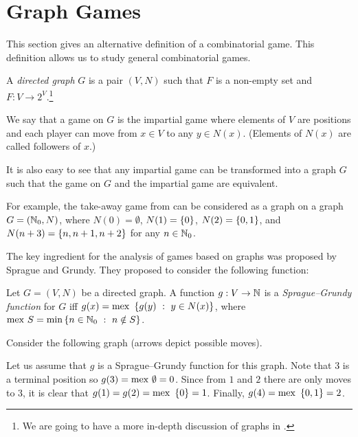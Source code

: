 \chapter{Graph Games}
This section gives an alternative definition of a combinatorial game.
This definition allows us to study general combinatorial games.
\begin{definition}
  A \emph{directed graph} $G$ is a pair $(V, N)$ such that $F$ is a non-empty
  set and $F : V \to 2^V$.\footnote{%
    We are going to have a more in-depth
    discussion of graphs in .
  }

  We say that a game on $G$ is the impartial game where elements of $V$ are
  positions and each player can move from $x \in V$ to any $y \in N(x)$.
  (Elements of $N(x)$ are called followers of $x$.)
\end{definition}

\begin{remark}
  It is also easy to see that any impartial game can be transformed into a graph
  $G$ such that the game on $G$ and the impartial game are equivalent.
\end{remark}

For example, the take-away game from 
can be considered as a graph on a graph $G = ({\mathbb{N}}_0, N)$,
where $N(0) = \emptyset$, $N(1) = \set{0}$, $N(2) = \set{0, 1}$, and
$N(n + 3) = \set{n, n + 1, n + 2}$ for any $n \in {\mathbb{N}}_0$.

The key ingredient for the analysis of games based on graphs was proposed
by Sprague and Grundy. They proposed to consider the following function:
\begin{definition}
  Let $G = (V, N)$ be a directed graph. A function $g : V \to {\mathbb{N}}$ is a
  \emph{Sprague--Grundy function} for $G$ iff
  $g(x) = \mex\set[y \in N(x)]{g(y)}$, where
  $\mex S = \min \set[n \notin S]{n \in \N_0}$.
\end{definition}


Consider the following graph (arrows depict possible moves).
\begin{center}
\end{center}
Let us assume that $g$ is a Sprague--Grundy function for this graph.
Note that $3$ is a terminal position so $g(3) = \mathrm{mex}~ \emptyset = 0$.
Since from $1$ and $2$ there are only moves to $3$, it is clear that
$g(1) = g(2) = \mex \set{0} = 1$. Finally, $g(4) = \mex \set{0, 1} = 2$.

